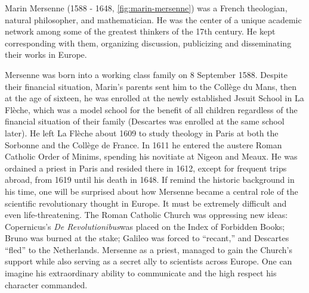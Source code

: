 \documentclass[b5paper]{article}
\begin{document}
\begin{mdframed}
Marin Mersenne (1588 - 1648, \cref{fig:marin-mersenne}) was a French theologian, natural philosopher, and mathematician. He was the center of a unique academic network among some of the greatest thinkers of the 17th century. He kept corresponding with them, organizing discussion, publicizing and disseminating their works in Europe.

Mersenne was born into a working class family on 8 September 1588. Despite their financial situation, Marin's parents sent him to the Collège du Mans, then at the age of sixteen, he was enrolled at the newly established Jesuit School in La Flèche, which was a model school for the benefit of all children regardless of the financial situation of their family (Descartes was enrolled at the same school later). He left La Flèche about 1609 to study theology in Paris at both the Sorbonne and the Collège de France. In 1611 he entered the austere Roman Catholic Order of Minims, spending his novitiate at Nigeon and Meaux. He was ordained a priest in Paris and resided there in 1612, except for frequent trips abroad, from 1619 until his death in 1648. If remind the historic background in his time, one will be surprised about how Mersenne became a central role of the scientific revolutionary thought in Europe. It must be extremely difficult and even life-threatening. The Roman Catholic Church was oppressing new ideas: Copernicus's \emph{De Revolutionibus}\footnotemark was placed on the Index of Forbidden Books; Bruno was burned at the stake; Galileo was forced to \enquote{recant,} and Descartes \enquote{fled} to the Netherlands.
Mersenne as a priest, managed to gain the Church's support while also serving as a secret ally to scientists across Europe. One can imagine his extraordinary ability to communicate and the high respect his character commanded.


\end{mdframed}
\end{document}
